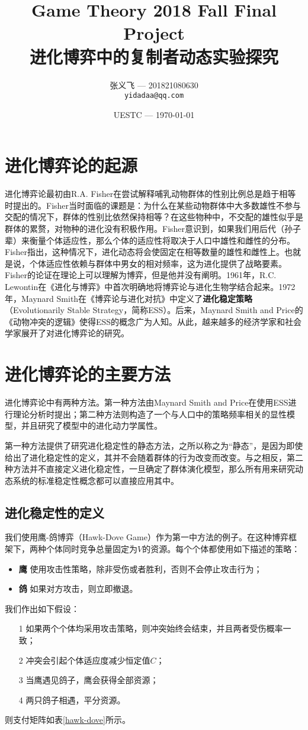 \documentclass[twocolumn]{article}
\title{Game Theory 2018 Fall Final Project \\ \textbf{进化博弈中的复制者动态实验探究}}
\author{张义飞 --- 201821080630\\ \texttt{yidadaa@qq.com}}
\date{\small{UESTC --- \today}}
\begin{document}
    \maketitle

    \section{进化博弈论的起源}
    进化博弈论最初由R.A. Fisher在尝试解释哺乳动物群体的性别比例总是趋于相等时提出的。Fisher当时面临的课题是：为什么在某些动物群体中大多数雄性不参与交配的情况下，群体的性别比依然保持相等？在这些物种中，不交配的雄性似乎是群体的累赘，对物种的进化没有积极作用。Fisher意识到，如果我们用后代（孙子辈）来衡量个体适应性，那么个体的适应性将取决于人口中雄性和雌性的分布。Fisher指出，这种情况下，进化动态将会使固定在相等数量的雄性和雌性上。也就是说，个体适应性依赖与群体中男女的相对频率，这为进化提供了战略要素。\\

    Fisher的论证在理论上可以理解为博弈，但是他并没有阐明。1961年，R.C. Lewontin在《进化与博弈》中首次明确地将博弈论与进化生物学结合起来。1972年，Maynard Smith在《博弈论与进化对抗》中定义了\textbf{进化稳定策略}（Evolutionarily Stable Strategy，简称ESS）。后来，Maynard Smith and Price的《动物冲突的逻辑》使得ESS的概念广为人知。从此，越来越多的经济学家和社会学家展开了对进化博弈论的研究。

    \section{进化博弈论的主要方法}
    进化博弈论中有两种方法。第一种方法由Maynard Smith and Price在使用ESS进行理论分析时提出；第二种方法则构造了一个与人口中的策略频率相关的显性模型，并且研究了模型中的进化动力学属性。

    第一种方法提供了研究进化稳定性的静态方法，之所以称之为“静态”，是因为即使给出了进化稳定性的定义，其并不会随着群体的行为改变而改变。与之相反，第二种方法并不直接定义进化稳定性，一旦确定了群体演化模型，那么所有用来研究动态系统的标准稳定性概念都可以直接应用其中。
    \subsection{进化稳定性的定义}
    我们使用鹰-鸽博弈（Hawk-Dove Game）作为第一中方法的例子。在这种博弈框架下，两种个体同时竞争总量固定为$V$的资源。每个个体都使用如下描述的策略：
    \begin{itemize}
        \item \textbf{鹰} 使用攻击性策略，除非受伤或者胜利，否则不会停止攻击行为；
        \item \textbf{鸽} 如果对方攻击，则立即撤退。
    \end{itemize}
    我们作出如下假设：
    \begin{itemize}
        \item[1] 如果两个个体均采用攻击策略，则冲突始终会结束，并且两者受伤概率一致；
        \item[2] 冲突会引起个体适应度减少恒定值$C$；
        \item[3] 当鹰遇见鸽子，鹰会获得全部资源；
        \item[4] 两只鸽子相遇，平分资源。
    \end{itemize}
    则支付矩阵如表\ref{hawk-dove}所示。
\end{document}
